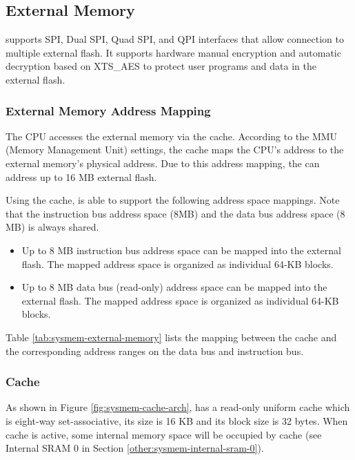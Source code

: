 \documentclass[main\_\_EN.tex]{subfiles}
\begin{document}
\subsection{External Memory} 
\label{para:sysmem-external-memory}

\chipname{} supports SPI, Dual SPI, Quad SPI, and QPI interfaces that allow connection to multiple external flash. It supports hardware manual encryption and automatic decryption based on XTS\_AES to protect user programs and data in the external flash.


\subsubsection{External Memory Address Mapping}

The CPU accesses the external memory via the cache. According to the MMU (Memory Management Unit) settings, the cache maps the CPU's address to the external memory's physical address. Due to this address mapping, the \chipname{} can address up to 16 MB external flash.


Using the cache, \chipname{} is able to support the following address space mappings. Note that the instruction bus address space (8MB) and the data bus address space (8 MB) is always shared.
\begin{itemize}
    \item Up to 8 MB instruction bus address space can be mapped into the external flash. The mapped address space is organized as individual 64-KB blocks.
    \item Up to 8 MB data bus (read-only) address space can be mapped into the external flash. The mapped address space is organized as individual 64-KB blocks.
\end{itemize}

Table \ref{tab:sysmem-external-memory} lists the mapping between the cache and the corresponding address ranges on the data bus and instruction bus.




\subsubsection{Cache}

As shown in Figure \ref{fig:sysmem-cache-arch}, \chipname{} has a read-only uniform cache which is eight-way set-associative, its size is 16 KB and its block size is 32 bytes. When cache is active, some internal memory space will be occupied by cache (see Internal SRAM 0 in Section \ref{other:sysmem-internal-sram-0}). 
\end{document}
